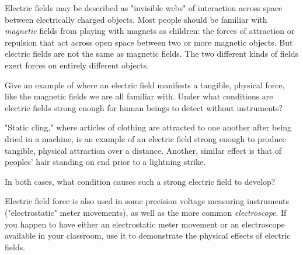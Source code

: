 

Electric fields may be described as "invisible webs" of interaction across space between electrically charged objects.  Most people should be familiar with {\it magnetic} fields from playing with magnets as children: the forces of attraction or repulsion that act across open space between two or more magnetic objects.  But electric fields are not the same as magnetic fields.  The two different kinds of fields exert forces on entirely different objects.

Give an example of where an electric field manifests a tangible, physical force, like the magnetic fields we are all familiar with.  Under what conditions are electric fields strong enough for human beings to detect without instruments?







"Static cling," where articles of clothing are attracted to one another after being dried in a machine, is an example of an electric field strong enough to produce tangible, physical attraction over a distance.  Another, similar effect is that of peoples' hair standing on end prior to a lightning strike.

In both cases, what condition causes such a strong electric field to develop?







Electric field force is also used in some precision voltage measuring instruments ("electrostatic" meter movements), as well as the more common {\it electroscope}.  If you happen to have either an electrostatic meter movement or an electroscope available in your classroom, use it to demonstrate the physical effects of electric fields.





